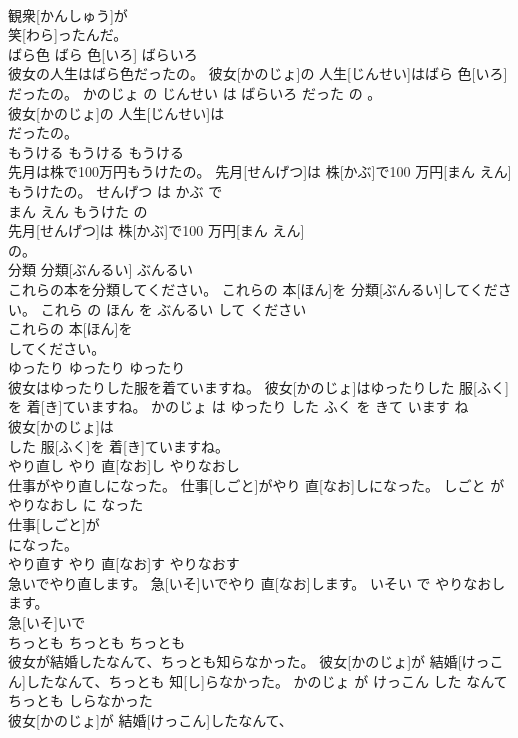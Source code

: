 \documentclass[8pt]{extreport}
\begin{document}
\begin{CJK}{UTF8}{min}
\\	観衆[かんしゅう]が
\\	笑[わら]ったんだ。			
\\	ばら色	ばら 色[いろ]	ばらいろ	
\\	彼女の人生はばら色だったの。	彼女[かのじょ]の 人生[じんせい]はばら 色[いろ]だったの。	かのじょ の じんせい は ばらいろ だった の 。	
\\	彼女[かのじょ]の 人生[じんせい]は
\\	だったの。			
\\	もうける	もうける	もうける	
\\	先月は株で100万円もうけたの。	先月[せんげつ]は 株[かぶ]で100 万円[まん えん]もうけたの。	せんげつ は かぶ で 
\\	まん えん もうけた の	
\\	先月[せんげつ]は 株[かぶ]で100 万円[まん えん]
\\	の。			
\\	分類	分類[ぶんるい]	ぶんるい	
\\	これらの本を分類してください。	これらの 本[ほん]を 分類[ぶんるい]してください。	これら の ほん を ぶんるい して ください	
\\	これらの 本[ほん]を
\\	してください。			
\\	ゆったり	ゆったり	ゆったり	
\\	彼女はゆったりした服を着ていますね。	彼女[かのじょ]はゆったりした 服[ふく]を 着[き]ていますね。	かのじょ は ゆったり した ふく を きて います ね	
\\	彼女[かのじょ]は
\\	した 服[ふく]を 着[き]ていますね。			
\\	やり直し	やり 直[なお]し	やりなおし	
\\	仕事がやり直しになった。	仕事[しごと]がやり 直[なお]しになった。	しごと が やりなおし に なった	
\\	仕事[しごと]が
\\	になった。			
\\	やり直す	やり 直[なお]す	やりなおす	
\\	急いでやり直します。	急[いそ]いでやり 直[なお]します。	いそい で やりなおします。	
\\	急[いそ]いで
\\	ちっとも	ちっとも	ちっとも	
\\	彼女が結婚したなんて、ちっとも知らなかった。	彼女[かのじょ]が 結婚[けっこん]したなんて、ちっとも 知[し]らなかった。	かのじょ が けっこん した なんて ちっとも しらなかった	
\\	彼女[かのじょ]が 結婚[けっこん]したなんて、

\end{CJK}
\end{document}
